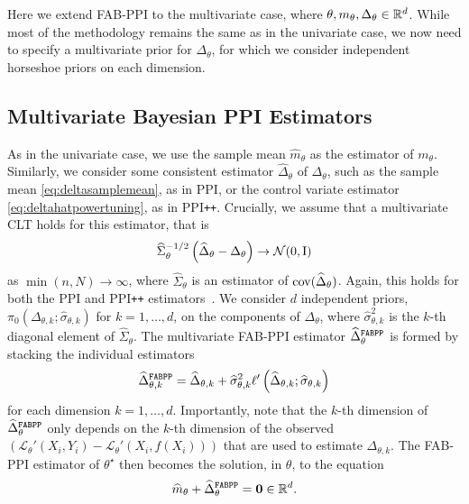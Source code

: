 Here we extend FAB-PPI to the multivariate case, where $\theta,m_\theta,\Delta_\theta \in \mathbb R^d$. While most of the methodology remains the same as in the univariate case, we now need to specify a multivariate prior for $\Delta_\theta$, for which we consider independent horseshoe priors on each dimension.

\subsection{Multivariate Bayesian PPI Estimators}
As in the univariate case, we use the sample mean $\widehat{m}_\theta$ as the estimator of $m_\theta$.
Similarly, we consider some consistent estimator $\widehat \Delta_\theta$ of $\Delta_\theta$, such as the sample mean \eqref{eq:deltasamplemean}, as in PPI, or the control variate estimator \eqref{eq:deltahatpowertuning}, as in PPI\texttt{++}.
Crucially, we assume that a multivariate CLT holds for this estimator, that is
\begin{equation*}
    \widehat\Sigma_\theta^{-1/2} \left(\widehat\Delta_\theta -\Delta_\theta\right)\to \mathcal N(0, \mathrm{I})
\end{equation*}
as $\min(n,N)\to\infty$, where $\widehat\Sigma_\theta$ is an estimator of $\mathrm{cov}(\widehat\Delta_\theta)$. Again, this holds for both the PPI and PPI\texttt{++} estimators~\citep{Angelopoulos2023,Angelopoulos2023a}.
We consider $d$ independent priors, $\pi_0(\Delta_{\theta,k};\widehat\sigma_{\theta,k})$ for $k = 1,\dots,d$, on the components of $\Delta_\theta$, where $\widehat\sigma_{\theta,k}^2$ is the $k$-th diagonal element of $\widehat\Sigma_\theta$. The multivariate FAB-PPI estimator $\widehat\Delta_{\theta}^{\mathrm{\texttt{FABPP}}}$ is formed by stacking the individual estimators
\begin{align*}
    \widehat\Delta_{\theta,k}^{\mathrm{\texttt{FABPP}}}= \widehat\Delta_{\theta,k} + \widehat\sigma_{\theta,k}^2 \ell'\left(\widehat\Delta_{\theta, k};\widehat\sigma_{\theta,k}\right)
\end{align*}
for each dimension $k = 1,\dots,d$. Importantly, note that the $k$-th dimension of $\widehat\Delta_{\theta}^{\mathrm{\texttt{FABPP}}}$ only depends on the $k$-th dimension of the observed $(\mathcal{L}_\theta'(X_i, Y_i) - \mathcal{L}_\theta'(X_i, f(X_i)))$ that are used to estimate $\Delta_{\theta,k}$.
The FAB-PPI estimator of $\theta^\star$ then becomes the solution, in $\theta$, to the equation
$$
\widehat m_\theta + \widehat\Delta_\theta^{\mathrm{\texttt{FABPP}}} = \mathbf{0} \in \mathbb{R}^d.
$$

